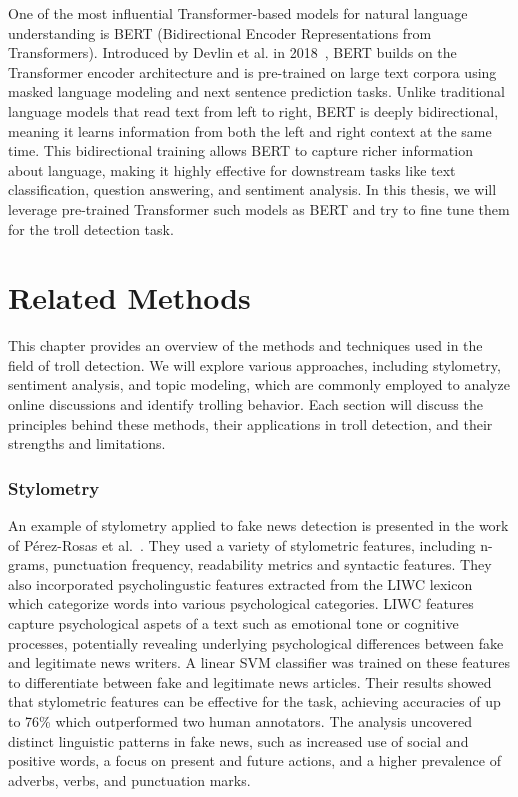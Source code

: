 \documentclass[twoside]{ctuthesis}
\theoremstyle{plain}
\theoremstyle{definition}
\theoremstyle{note}
\begin{document}
One of the most influential Transformer-based models for natural language understanding is BERT (Bidirectional Encoder Representations from Transformers). Introduced by Devlin et al. in 2018~\cite{Devlin2018}, BERT builds on the Transformer encoder architecture and is pre-trained on large text corpora using masked language modeling and next sentence prediction tasks. Unlike traditional language models that read text from left to right, BERT is deeply bidirectional, meaning it learns information from both the left and right context at the same time. This bidirectional training allows BERT to capture richer information about language, making it highly effective for downstream tasks like text classification, question answering, and sentiment analysis. In this thesis, we will leverage pre-trained Transformer such models as BERT and try to fine tune them for the troll detection task.\par

\chapter{Related Methods}
This chapter provides an overview of the methods and techniques used in the field of troll detection. We will explore various approaches, including stylometry, sentiment analysis, and topic modeling, which are commonly employed to analyze online discussions and identify trolling behavior. Each section will discuss the principles behind these methods, their applications in troll detection, and their strengths and limitations.\par

\subsection{Stylometry}
An example of stylometry applied to fake news detection is presented in the work of Pérez-Rosas et al.~\cite{PerezRosas2018Stylometry}. They used a variety of stylometric features, including n-grams, punctuation frequency, readability metrics and syntactic features. They also incorporated psycholingustic features extracted from the LIWC lexicon which categorize words into various psychological categories. LIWC features capture psychological aspets of a text such as emotional tone or cognitive processes, potentially revealing underlying psychological differences between fake and legitimate news writers. A linear SVM classifier was trained on these features to differentiate between fake and legitimate news articles. Their results showed that stylometric features can be effective for the task, achieving accuracies of up to 76\% which outperformed two human annotators. The analysis uncovered distinct linguistic patterns in fake news, such as increased use of social and positive words, a focus on present and future actions, and a higher prevalence of adverbs, verbs, and punctuation marks. 
\end{document}
